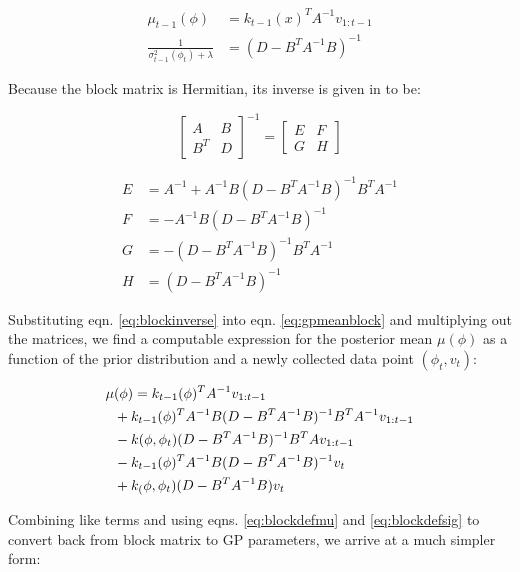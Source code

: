 \documentclass[12pt, conference]{IEEEtran}
\begin{document}
\begin{align}
    \mu_{t-1}(\phi) &= k_{t-1}(x)^T A^{-1} v_{1:t-1} \label{eq:blockdefmu}\\ 
    \frac{1}{\sigma_{t-1}^2(\phi_t)+\lambda} &= (D-B^T A^{-1}B)^{-1} \label{eq:blockdefsig}
\end{align}
\smallskip

Because the block matrix is Hermitian, its inverse is given in \cite{lu02} to be:

\begin{equation}
    \begin{bmatrix}
        A & B \\
        B^T & D
    \end{bmatrix}^{-1}
    =
    \begin{bmatrix}
        E & F \\
        G & H
    \end{bmatrix}
    \label{eq:blockinverse}
\end{equation}

\begin{align}
    E &= A^{-1}+A^{-1}B(D-B^T A^{-1} B)^{-1}B^T A^{-1} \nonumber \\
    F &= -A^{-1}B(D-B^T A^{-1} B)^{-1} \nonumber \\
    G &= -(D-B^T A^{-1} B)^{-1}B^T A^{-1} \nonumber \\
    H &= (D-B^T A^{-1} B)^{-1} \nonumber
\end{align}
\smallskip

Substituting eqn. \ref{eq:blockinverse} into eqn. \ref{eq:gpmeanblock} and multiplying out the matrices, we find a computable expression for the posterior mean $\mu(\phi)$ as a function of the prior distribution and a newly collected data point $(\phi_t,v_t)$:

\begin{align}
\begin{split}
    \tiny
    \mu&(\phi) = k_{t-1}(\phi)^T A^{-1} v_{1:t-1} \\
    &+ k_{t-1}(\phi)^T A^{-1} B (D-B^T A^{-1} B)^{-1} B^T A^{-1} v_{1:t-1} \\
    &- k(\phi,\phi_t)(D-B^T A^{-1} B)^{-1} B^T A v_{1:t-1} \\
    &- k_{t-1}(\phi)^T A^{-1} B(D-B^T A^{-1}B)^{-1}v_t \\
    &+ k_(\phi,\phi_t)(D-B^T A^{-1}B)v_t
\end{split}
\end{align}

Combining like terms and using eqns. \ref{eq:blockdefmu} and \ref{eq:blockdefsig} to convert back from block matrix to GP parameters, we arrive at a much simpler form:
\end{document}
